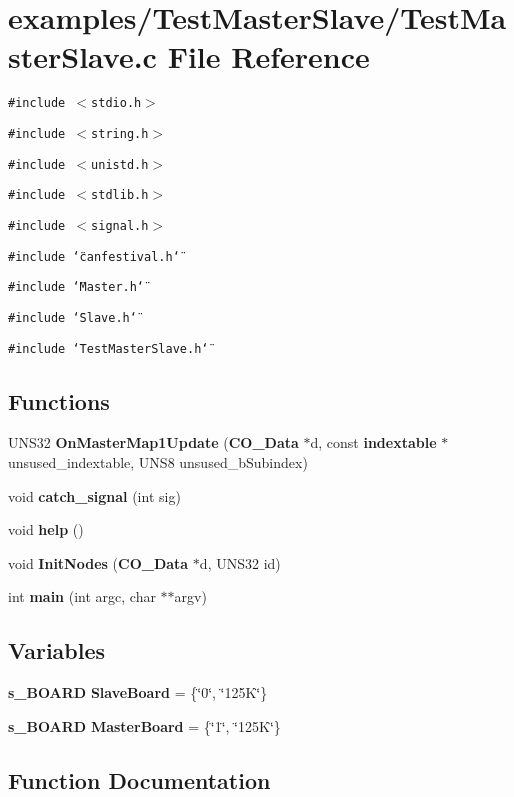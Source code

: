 \section{examples/Test\-Master\-Slave/Test\-Master\-Slave.c File Reference}
\label{TestMasterSlave_8c}
{\tt \#include $<$stdio.h$>$}\par
{\tt \#include $<$string.h$>$}\par
{\tt \#include $<$unistd.h$>$}\par
{\tt \#include $<$stdlib.h$>$}\par
{\tt \#include $<$signal.h$>$}\par
{\tt \#include \char`\"{}canfestival.h\char`\"{}}\par
{\tt \#include \char`\"{}Master.h\char`\"{}}\par
{\tt \#include \char`\"{}Slave.h\char`\"{}}\par
{\tt \#include \char`\"{}Test\-Master\-Slave.h\char`\"{}}\par
\subsection*{Functions}
\begin{CompactItemize}
\item 
UNS32 {\bf On\-Master\-Map1Update} ({\bf CO\_\-Data} $\ast$d, const {\bf indextable} $\ast$unsused\_\-indextable, UNS8 unsused\_\-b\-Subindex)
\item 
void {\bf catch\_\-signal} (int sig)
\item 
void {\bf help} ()
\item 
void {\bf Init\-Nodes} ({\bf CO\_\-Data} $\ast$d, UNS32 id)
\item 
int {\bf main} (int argc, char $\ast$$\ast$argv)
\end{CompactItemize}
\subsection*{Variables}
\begin{CompactItemize}
\item 
{\bf s\_\-BOARD} {\bf Slave\-Board} = \{\char`\"{}0\char`\"{}, \char`\"{}125K\char`\"{}\}
\item 
{\bf s\_\-BOARD} {\bf Master\-Board} = \{\char`\"{}1\char`\"{}, \char`\"{}125K\char`\"{}\}
\end{CompactItemize}


\subsection{Function Documentation}
